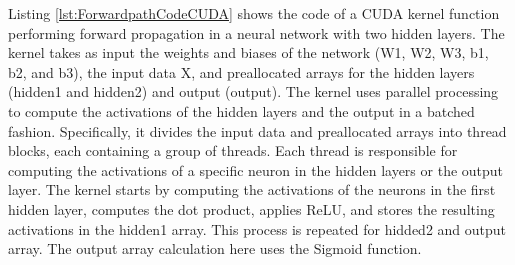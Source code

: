 \documentclass[11pt]{article}
\begin{document}
Listing \ref{lst:ForwardpathCodeCUDA} shows the code of a CUDA kernel function performing forward propagation in a neural network with two hidden layers. The kernel takes as input the weights and biases of the network (W1, W2, W3, b1, b2, and b3), the input data X, and preallocated arrays for the hidden layers (hidden1 and hidden2) and output (output). The kernel uses parallel processing to compute the activations of the hidden layers and the output in a batched fashion. Specifically, it divides the input data and preallocated arrays into thread blocks, each containing a group of threads. Each thread is responsible for computing the activations of a specific neuron in the hidden layers or the output layer. The kernel starts by computing the activations of the neurons in the first hidden layer, computes the dot product, applies ReLU, and stores the resulting activations in the hidden1 array. This process is repeated for hidded2 and output array. The output array calculation here uses the Sigmoid function. 
\end{document}
